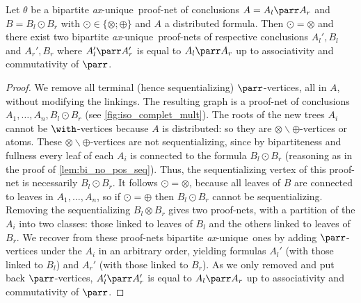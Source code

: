 \documentclass{lmcs}
\newcommand*{\tens}{\otimes} %
\newcommand*{\tp}{\tens\backslash\oplus} %
\newcommand*{\unique}{\textit{ax}-unique}
\begin{document}
\begin{lem}
\label{lem:iso_complet_mult}
Let $\theta$ be a bipartite \unique\ proof-net of conclusions $A=A_l\parr A_r$ and $B=B_l\odot B_r$ with $\odot\in\{\tens;\oplus\}$ and $A$ a distributed formula.
Then $\odot=\tens$ and there exist two bipartite \unique\ proof-nets of respective conclusions $A_l',B_l$ and $A_r',B_r$ where $A_l'\parr A_r'$ is equal to $A_l\parr A_r$ up to associativity and commutativity of $\parr$.
\end{lem}
\begin{proof}
We remove all terminal (hence sequentializing) $\parr$-vertices, all in $A$, without modifying the linkings.
The resulting graph is a proof-net of conclusions $A_1,\dots,A_n,B_l\odot B_r$ (see \autoref{fig:iso_complet_mult}).
The roots of the new trees $A_i$ cannot be $\with$-vertices because $A$ is distributed: so they are $\tp$-vertices or atoms.
These $\tp$-vertices are not sequentializing, since by bipartiteness and fullness every leaf of each $A_i$ is connected to the formula $B_l\odot B_r$ (reasoning as in the proof of \autoref{lem:bi_no_pos_seq}).
Thus, the sequentializing vertex of this proof-net is necessarily $B_l\odot B_r$.
It follows $\odot=\tens$, because all leaves of $B$ are connected to leaves in $A_1,\dots,A_n$, so if $\odot=\oplus$ then $B_l\odot B_r$ cannot be sequentializing.
Removing the sequentializing $B_l\tens B_r$ gives two proof-nets, with a partition of the $A_i$ into two classes: those linked to leaves of $B_l$ and the others linked to leaves of $B_r$.
We recover from these proof-nets bipartite \unique\ ones by adding $\parr$-vertices under the $A_i$ in an arbitrary order, yielding formulas $A_l'$ (with those linked to $B_l$) and $A_r'$ (with those linked to $B_r$).
As we only removed and put back $\parr$-vertices, $A_l'\parr A_r'$ is equal to $A_l\parr A_r$ up to associativity and commutativity of $\parr$.
\end{proof}
\end{document}
